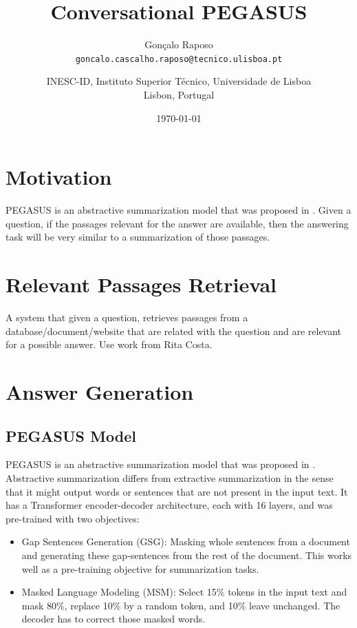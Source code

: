 \documentclass[a4paper, 10pt]{article}
\title{Conversational PEGASUS}
\date{\today}	%
\author{
	Gonçalo Raposo \\
	\texttt{goncalo.cascalho.raposo@tecnico.ulisboa.pt} \\
	
	\and
	INESC-ID, Instituto Superior Técnico, Universidade de Lisboa \\[2ex]
	Lisbon, Portugal
}
\begin{document}
\maketitle


\begin{abstract}

\end{abstract}



\section{Motivation}

    PEGASUS is an abstractive summarization model that was proposed in \cite{Zhang2020b}. Given a question, if the passages relevant for the answer are available, then the answering task will be very similar to a summarization of those passages.

\section{Relevant Passages Retrieval}

    A system that given a question, retrieves passages from a database/document/website that are related with the question and are relevant for a possible answer. Use work from Rita Costa.

\section{Answer Generation}
    \subsection{PEGASUS Model}
    
        PEGASUS is an abstractive summarization model that was proposed in \cite{Zhang2020b}. Abstractive summarization differs from extractive summarization in the sense that it might output words or sentences that are not present in the input text. It has a Transformer encoder-decoder architecture, each with 16 layers, and was pre-trained with two objectives:

        \begin{itemize}
            \item Gap Sentences Generation (GSG): Masking whole sentences from a document and generating these gap-sentences from the rest of the document. This works well as a pre-training objective for summarization tasks.
            \item Masked Language Modeling (MSM): Select 15\% tokens in the input text and mask 80\%, replace 10\% by a random token, and 10\% leave unchanged. The decoder has to correct those masked words.
        \end{itemize}
\end{document}
